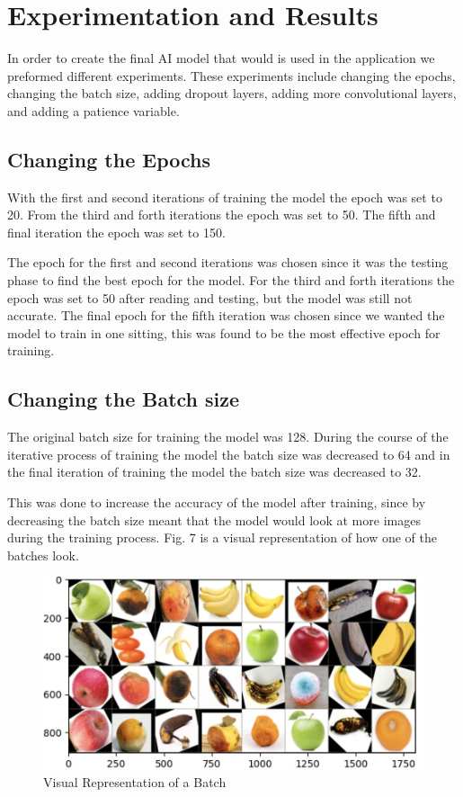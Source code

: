 \documentclass[conference]{IEEEtran}
\begin{document}
\section{Experimentation and Results}

In order to create the final AI model that would is used in the application we preformed different experiments. These experiments include changing the epochs, changing the batch size, adding dropout layers, adding more convolutional layers, and adding a patience variable.

\subsection{Changing the Epochs}

With the first and second iterations of training the model the epoch was set to 20. From the third and forth iterations the epoch was set to 50. The fifth and final iteration the epoch was set to 150.

The epoch for the first and second iterations was chosen since it was the testing phase to find the best epoch for the model. For the third and forth iterations the epoch was set to 50 after reading \cite{b4} and testing, but the model was still not accurate. The final epoch for the fifth iteration was chosen since we wanted the model to train in one sitting, this was found to be the most effective epoch for training.

\subsection{Changing the Batch size}

The original batch size for training the model was 128. During the course of the iterative process of training the model the batch size was decreased to 64 and in the final iteration of training the model the batch size was decreased to 32.

This was done to increase the accuracy of the model after training, since by decreasing the batch size meant that the model would look at more images during the training process. Fig. 7 is a visual representation of how one of the batches look.

\begin{figure}[h]
    \centering
    \includegraphics[width=\linewidth]{Batch_Representation.jpg}
    \caption{Visual Representation of a Batch}
    \label{fig}
\end{figure}
\end{document}
